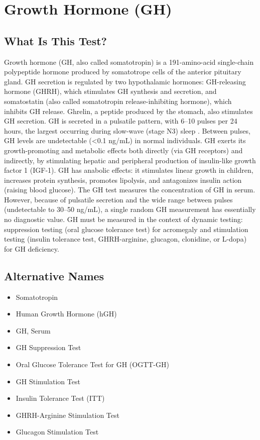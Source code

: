 \chapter{Growth Hormone (GH)}

\section*{What Is This Test?}
Growth hormone (GH, also called somatotropin) is a 191-amino-acid single-chain polypeptide hormone produced by somatotrope cells of the anterior pituitary gland. GH secretion is regulated by two hypothalamic hormones: GH-releasing hormone (GHRH), which stimulates GH synthesis and secretion, and somatostatin (also called somatotropin release-inhibiting hormone), which inhibits GH release. Ghrelin, a peptide produced by the stomach, also stimulates GH secretion. GH is secreted in a pulsatile pattern, with 6--10 pulses per 24 hours, the largest occurring during slow-wave (stage N3) sleep \cite{tietz2023textbook}. Between pulses, GH levels are undetectable (<0.1 ng/mL) in normal individuals. GH exerts its growth-promoting and metabolic effects both directly (via GH receptors) and indirectly, by stimulating hepatic and peripheral production of insulin-like growth factor 1 (IGF-1). GH has anabolic effects: it stimulates linear growth in children, increases protein synthesis, promotes lipolysis, and antagonizes insulin action (raising blood glucose). The GH test measures the concentration of GH in serum. However, because of pulsatile secretion and the wide range between pulses (undetectable to 30--50 ng/mL), a single random GH measurement has essentially no diagnostic value. GH must be measured in the context of dynamic testing: suppression testing (oral glucose tolerance test) for acromegaly and stimulation testing (insulin tolerance test, GHRH-arginine, glucagon, clonidine, or L-dopa) for GH deficiency.

\section*{Alternative Names}
\begin{itemize}
  \item Somatotropin
  \item Human Growth Hormone (hGH)
  \item GH, Serum
  \item GH Suppression Test
  \item Oral Glucose Tolerance Test for GH (OGTT-GH)
  \item GH Stimulation Test
  \item Insulin Tolerance Test (ITT)
  \item GHRH-Arginine Stimulation Test
  \item Glucagon Stimulation Test
\end{itemize}
